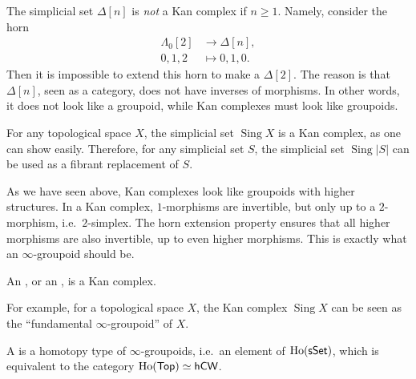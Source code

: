 \begin{example}
    The simplicial set $\Delta[n]$ is \emph{not} a Kan complex if $n\geq1$.
    Namely, consider the horn
    \[\begin{aligned}
        \Lambda_0[2] &\to \Delta[n], \\
        0,1,2 &\mapsto 0,1,0.
    \end{aligned}\]
    Then it is impossible to extend this horn to make a $\Delta[2]$.
    The reason is that $\Delta[n]$, seen as a category,
    does not have inverses of morphisms. In other words, it does not look like a groupoid,
    while Kan complexes must look like groupoids. \varqed
\end{example}

\begin{example}
    For any topological space $X$, the simplicial set $\operatorname{Sing}X$
    is a Kan complex, as one can show easily.
    Therefore, for any simplicial set $S$, the simplicial set
    $\operatorname{Sing}|S|$
    can be used as a fibrant replacement of $S$. \varqed
\end{example}

As we have seen above, Kan complexes look like groupoids with higher structures.
In a Kan complex, $1$-morphisms are invertible,
but only up to a $2$-morphism, i.e.\ $2$-simplex.
The horn extension property ensures that all higher morphisms
are also invertible, up to even higher morphisms.
This is exactly what an $\infty$-groupoid should be.

\begin{definition}
    An , or an ,
    is a Kan complex.
\end{definition}

For example, for a topological space $X$,
the Kan complex $\operatorname{Sing}X$ can be seen as 
the ``fundamental $\infty$-groupoid'' of $X$.

\begin{definition}
    A  is a homotopy type of $\infty$-groupoids,
    i.e.\ an element of $\operatorname{Ho}(\mathsf{sSet})$, which is equivalent to the category
    $\operatorname{Ho}(\mathsf{Top})\simeq\mathsf{hCW}$.
\end{definition}

